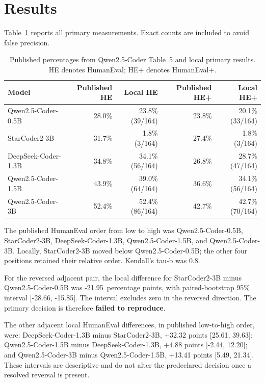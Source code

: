 \documentclass[10pt,twocolumn]{article}
\newcommand{\pp}{percentage points}
\begin{document}
\section{Results}

Table~\ref{tab:results} reports all primary measurements. Exact counts are included to avoid false precision.

\begin{table}[t]
\centering
\caption{Published percentages from Qwen2.5-Coder Table~5 and local primary results. HE denotes HumanEval; HE+ denotes HumanEval+.}
\label{tab:results}
\small
\begin{tabular}{@{}lrrrr@{}}
\toprule
Model & Published HE & Local HE & Published HE+ & Local HE+ \\
\midrule
Qwen2.5-Coder-0.5B & 28.0\% & 23.8\% (39/164) & 23.8\% & 20.1\% (33/164) \\
StarCoder2-3B & 31.7\% & 1.8\% (3/164) & 27.4\% & 1.8\% (3/164) \\
DeepSeek-Coder-1.3B & 34.8\% & 34.1\% (56/164) & 26.8\% & 28.7\% (47/164) \\
Qwen2.5-Coder-1.5B & 43.9\% & 39.0\% (64/164) & 36.6\% & 34.1\% (56/164) \\
Qwen2.5-Coder-3B & 52.4\% & 52.4\% (86/164) & 42.7\% & 42.7\% (70/164) \\
\bottomrule
\end{tabular}
\end{table}

The published HumanEval order from low to high was Qwen2.5-Coder-0.5B, StarCoder2-3B, DeepSeek-Coder-1.3B, Qwen2.5-Coder-1.5B, and Qwen2.5-Coder-3B. Locally, StarCoder2-3B moved below Qwen2.5-Coder-0.5B; the other four positions retained their relative order. Kendall's tau-b was 0.8.

For the reversed adjacent pair, the local difference for StarCoder2-3B minus Qwen2.5-Coder-0.5B was -21.95~\pp{}, with paired-bootstrap 95\% interval [-28.66, -15.85]. The interval excludes zero in the reversed direction. The primary decision is therefore \textbf{failed to reproduce}.

The other adjacent local HumanEval differences, in published low-to-high order, were: DeepSeek-Coder-1.3B minus StarCoder2-3B, +32.32 points [25.61, 39.63]; Qwen2.5-Coder-1.5B minus DeepSeek-Coder-1.3B, +4.88 points [-2.44, 12.20]; and Qwen2.5-Coder-3B minus Qwen2.5-Coder-1.5B, +13.41 points [5.49, 21.34]. These intervals are descriptive and do not alter the predeclared decision once a resolved reversal is present.
\end{document}
